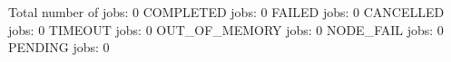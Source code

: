 Total number of jobs: 0
COMPLETED jobs: 0
FAILED jobs: 0
CANCELLED jobs: 0
TIMEOUT jobs: 0
OUT_OF_MEMORY jobs: 0
NODE_FAIL jobs: 0
PENDING jobs: 0
